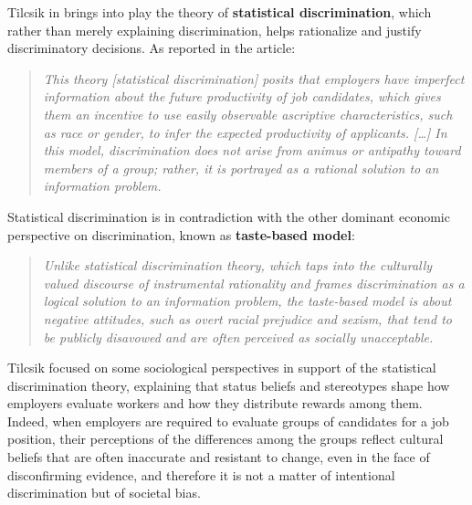 Tilcsik in \cite{tilcsik2020statistical} brings into play the theory of \textbf{statistical discrimination}, which rather than merely explaining discrimination, helps rationalize and justify discriminatory decisions. As reported in the article:
\begin{quote}\emph{This theory \emph{[statistical discrimination]} posits that employers have imperfect information about the future productivity of job candidates, which gives them an incentive to use easily observable ascriptive characteristics, such as race or gender, to infer the expected productivity of applicants. \emph{[\ldots]} In this model, discrimination does not arise from animus or antipathy toward members of a group; rather, it is portrayed as a rational solution to an information problem.} \cite[p.~94]{tilcsik2020statistical}
\end{quote}

Statistical discrimination is in contradiction with the other dominant economic perspective on discrimination, known as \textbf{taste-based model}:
\begin{quote}\emph{Unlike statistical discrimination theory, which taps into the culturally valued discourse of instrumental rationality and frames discrimination as a logical solution to an information problem, the taste-based model is about negative attitudes, such as overt racial prejudice and sexism, that tend to be publicly disavowed and are often perceived as socially unacceptable.} \cite[p.~95]{tilcsik2020statistical}
\end{quote}

Tilcsik focused on some sociological perspectives in support of the statistical discrimination theory, explaining that status beliefs and stereotypes shape how employers evaluate workers and how they distribute rewards among them. Indeed, when employers are required to evaluate groups of candidates for a job position, their perceptions of the differences among the groups reflect cultural beliefs that are often inaccurate and resistant to change, even in the face of disconfirming evidence, and therefore it is not a matter of intentional discrimination but of societal bias.

